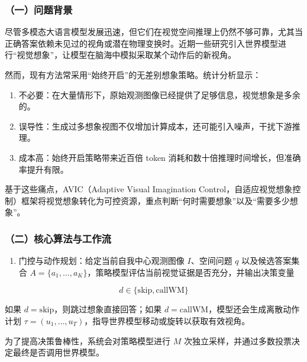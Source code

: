 \hypertarget{ux4e00ux95eeux9898ux80ccux666f-18}{%
\subsubsection{（一）问题背景}\label{ux4e00ux95eeux9898ux80ccux666f-18}}

尽管多模态大语言模型发展迅速，但它们在视觉空间推理上仍然不够可靠，尤其当正确答案依赖未见过的视角或潜在物理变换时。近期一些研究引入世界模型进行``视觉想象''，让模型在脑海中模拟采取某个动作后的新视角。

然而，现有方法常采用``始终开启''的无差别想象策略。统计分析显示：

\begin{enumerate}
\def\labelenumi{\arabic{enumi}.}
\tightlist
\item
  不必要：在大量情形下，原始观测图像已经提供了足够信息，视觉想象是多余的。
\item
  误导性：生成过多想象视图不仅增加计算成本，还可能引入噪声，干扰下游推理。
\item
  成本高：始终开启策略带来近百倍 token 消耗和数十倍推理时间增长，但准确率提升有限。
\end{enumerate}

基于这些痛点，AVIC（Adaptive Visual Imagination Control，自适应视觉想象控制）框架将视觉想象转化为可控资源，重点判断``何时需要想象''以及``需要多少想象''。

\hypertarget{ux4e8cux6838ux5fc3ux7b97ux6cd5ux4e0eux5de5ux4f5cux6d41-1}{%
\subsubsection{（二）核心算法与工作流}\label{ux4e8cux6838ux5fc3ux7b97ux6cd5ux4e0eux5de5ux4f5cux6d41-1}}

\begin{enumerate}
\def\labelenumi{\arabic{enumi}.}
\tightlist
\item
  门控与动作规划：给定当前自我中心观测图像 \(I\)、空间问题 \(q\) 以及候选答案集合 \(A=\{a_1,\ldots,a_K\}\)，策略模型评估当前视觉证据是否充分，并输出决策变量
\end{enumerate}

\[
d \in \{\mathrm{skip}, \mathrm{callWM}\}
\]

如果 \(d=\mathrm{skip}\)，则跳过想象直接回答；如果 \(d=\mathrm{callWM}\)，模型还会生成离散动作计划 \(\tau=(u_1,\ldots,u_T)\)，指导世界模型移动或旋转以获取有效视角。

为了提高决策鲁棒性，系统会对策略模型进行 \(M\) 次独立采样，并通过多数投票决定最终是否调用世界模型。

